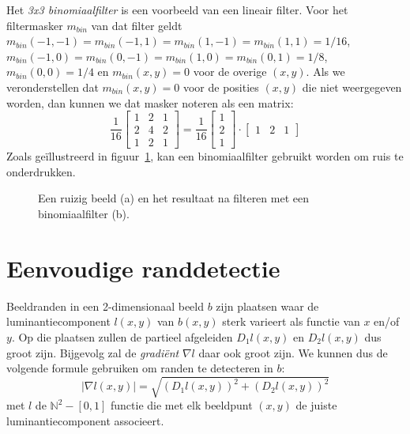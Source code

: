 Het \emph{3x3 binomiaalfilter} is een voorbeeld van een lineair filter. Voor het filtermasker 
$m_{bin}$ van dat filter geldt $m_{bin}(-1,-1)=m_{bin}(-1,1)=m_{bin}(1,-1)=m_{bin}(1,1)=1/16$, 
$m_{bin}(-1,0)=m_{bin}(0,-1)=m_{bin}(1,0)=m_{bin}(0,1)=1/8$, $m_{bin}(0,0)=1/4$ en 
$m_{bin}(x,y)=0$ voor de overige $(x,y)$. Als we veronderstellen dat $m_{bin}(x,y)=0$ voor de 
posities $(x,y)$ die niet weergegeven worden, dan kunnen we dat masker noteren als een matrix:
$$
\frac{1}{16}\left[ \begin{array}{ccc} 1 & 2 & 1\\ 2 & 4 & 2\\ 1 & 2 & 1 \end{array} \right]
= \frac{1}{16}\left[ \begin{array}{c} 1\\ 2\\ 1 \end{array} \right] \cdot 
\left[ \begin{array}{ccc} 1 & 2 & 1 \end{array} \right]
$$
Zoals ge\"illustreerd in figuur~\ref{fig:indische_ruizig_en_binom}, kan een binomiaalfilter gebruikt worden om ruis te onderdrukken.

\begin{figure}[tb]
\begin{center}
\caption{\label{fig:indische_ruizig_en_binom}Een ruizig beeld (a) en het resultaat na filteren met een binomiaalfilter (b).}
\end{center}
\end{figure}

\section{Eenvoudige randdetectie}

Beeldranden in een 2-dimensionaal beeld $b$ zijn plaatsen waar de luminantiecomponent $l(x,y)$ van $b(x,y)$ 
sterk varieert als functie van $x$ en/of $y$. Op die plaatsen zullen de partieel afgeleiden $D_1 l(x,y)$ en 
$D_2 l(x,y)$ dus groot zijn. Bijgevolg zal de \emph{gradi\"ent} $\nabla l$ daar ook groot zijn. We kunnen 
dus de volgende formule gebruiken om randen te detecteren in $b$: 
$$
|\nabla l(x,y)| = \sqrt{(D_1 l(x,y))^2 + (D_2 l(x,y))^2}
$$ 
met $l$ de $\mathbb{N}^2 - [0,1]$ functie die met elk beeldpunt $(x,y)$ de juiste luminantiecomponent associeert.

